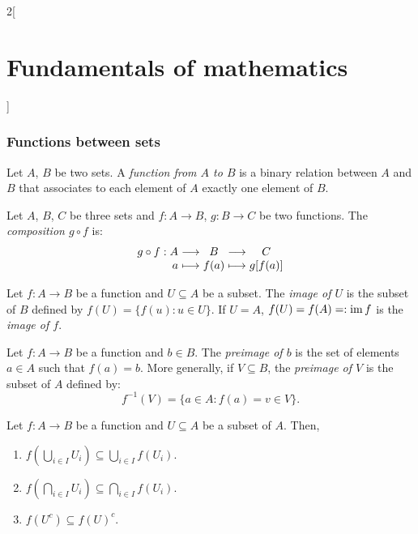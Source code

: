 \documentclass[../../../main.tex]{subfiles}
\begin{document}
\begin{multicols}{2}[\section{Fundamentals of mathematics}]
    \subsubsection*{Functions between sets}
    \begin{definition}
        Let $A$, $B$ be two sets. A \textit{function from $A$ to $B$} is a binary relation between $A$ and $B$ that associates to each element of $A$ exactly one element of $B$.
    \end{definition}
    \begin{definition}
        Let $A$, $B$, $C$ be three sets and $f:A\rightarrow B$, $g:B\rightarrow C$ be two functions. The \textit{composition $g\circ f$} is:
        $$\begin{array}{r@{\hspace{0.5\tabcolsep}}c@{\hspace{0.5\tabcolsep}}c@{\hspace{0.5\tabcolsep}}c@{\hspace{0.5\tabcolsep}}c}
            g\circ f:A&\longrightarrow & B & \longrightarrow &C\\
            a&\longmapsto & f(a) & \longmapsto & g[f(a)]
        \end{array}$$
    \end{definition}
    \begin{definition}
        Let $f:A\rightarrow B$ be a function and $U\subseteq A$ be a subset. The \textit{image of $U$} is the subset of $B$ defined by $f(U)=\{f(u): u\in U\}$. If $U=A$, $f(U)=f(A)=:\operatorname{im} f$ is the \textit{image of $f$}.
    \end{definition}
    \begin{definition}
        Let $f:A\rightarrow B$ be a function and $b\in B$. The \textit{preimage of $b$} is the set of elements $a\in A$ such that $f(a)=b$. More generally, if $V\subseteq B$, the \textit{preimage of $V$} is the subset of $A$ defined by: $$f^{-1}(V)=\{a\in A: f(a)=v\in V\}.$$
    \end{definition}
    \begin{prop}
        Let $f:A\rightarrow B$ be a function and $U\subseteq A$ be a subset of $A$. Then,
        \begin{enumerate}
            \item $f\left(\bigcup_{i\in I}U_i\right)\subseteq\bigcup_{i\in I}f(U_i)$.
            \item $f\left(\bigcap_{i\in I}U_i\right)\subseteq\bigcap_{i\in I}f(U_i)$.
            \item $f(U^c)\subseteq f(U)^c$.

\end{enumerate}
\end{prop}
\end{multicols}
\end{document}
